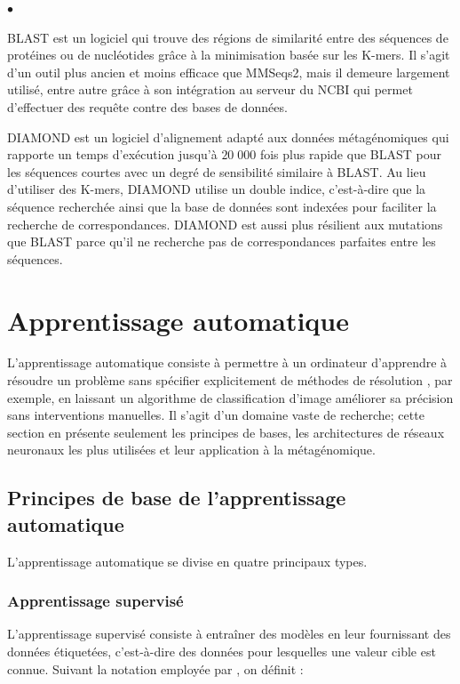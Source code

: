 \begin{list}{$\bullet$}{}
    \item BLAST \cite{blast} est un logiciel qui trouve des régions de similarité entre des
        séquences de protéines ou de nucléotides grâce à la minimisation basée sur les K-mers. Il
        s'agit d'un outil plus ancien et moins efficace que MMSeqs2, mais il demeure largement
        utilisé, entre autre grâce à son intégration au serveur du NCBI qui permet d'effectuer des
        requête contre des bases de données.
    \item DIAMOND \cite{diamond} est un logiciel d'alignement adapté aux données métagénomiques qui
        rapporte un temps d'exécution jusqu'à $20\;000$ fois plus rapide que BLAST pour les
        séquences courtes avec un degré de sensibilité similaire à BLAST. Au lieu d'utiliser des
        K-mers, DIAMOND utilise un double indice, c'est-à-dire que la séquence recherchée ainsi que
        la base de données sont indexées pour faciliter la recherche de correspondances. DIAMOND est
        aussi plus résilient aux mutations que BLAST parce qu'il ne recherche pas de correspondances
        parfaites entre les séquences.
\end{list}

\section{Apprentissage automatique}
L'apprentissage automatique \cite{oqlfAA} consiste à permettre à un ordinateur d'apprendre à
résoudre un problème sans spécifier explicitement de méthodes de résolution \cite{samue1959}, par
exemple, en laissant un algorithme de classification d'image améliorer sa précision sans
interventions manuelles. Il s'agit d'un domaine vaste de recherche; cette section en présente
seulement les principes de bases, les architectures de réseaux neuronaux les plus utilisées et leur
application à la métagénomique.

\subsection{Principes de base de l'apprentissage automatique}
L'apprentissage automatique se divise en quatre principaux types.

\subsubsection{Apprentissage supervisé}
L'apprentissage supervisé consiste à entraîner des modèles en leur fournissant des données
étiquetées, c'est-à-dire des données pour lesquelles une valeur cible est connue. Suivant la
notation employée par \cite{vapnik1995}, on définit :

